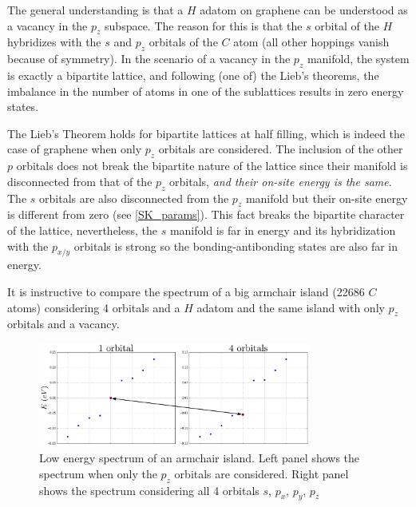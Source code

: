 The general understanding is that a $H$ adatom on graphene can be understood as a vacancy in the $p_z$ subspace. The reason for this is that the $s$ orbital of the $H$ hybridizes with the $s$ and $p_z$ orbitals of the $C$ atom (all other hoppings vanish because of symmetry). In the scenario of a vacancy in the $p_z$ manifold, the system is exactly a bipartite lattice, and following (one of) the Lieb's theorems, the imbalance in the number of atoms in one of the sublattices results in zero energy states.

The Lieb's Theorem holds for bipartite lattices at half filling, which is indeed the case of graphene when only $p_z$ orbitals are considered. The inclusion of the other $p$ orbitals does not break the bipartite nature of the lattice since their manifold is disconnected from that of the $p_z$ orbitals, \emph{and their on-site energy is the same}.
The $s$ orbitals are also disconnected from the $p_z$ manifold but their on-site energy is different from zero (see \ref{SK_params}). This fact breaks the bipartite character of the lattice, nevertheless, the $s$ manifold is far in energy and its hybridization with the $p_{x/y}$ orbitals is strong so the bonding-antibonding states are also far in energy.

It is instructive to compare the spectrum of a big armchair island (22686 $C$ atoms) considering 4 orbitals and a $H$ adatom and the same island with only $p_z$ orbitals and a vacancy.

\begin{figure}[h!]
  \centering
  \includegraphics[width=0.8\textwidth]{defects/fig/spectrum.pdf}
  \vspace{-5pt}
\caption{Low energy spectrum of an armchair island. Left panel shows the spectrum when only the $p_z$ orbitals are considered. Right panel shows the spectrum considering all 4 orbitals $s$, $p_x$, $p_y$, $p_z$}
\label{spectrum}
\end{figure}
\FloatBarrier


